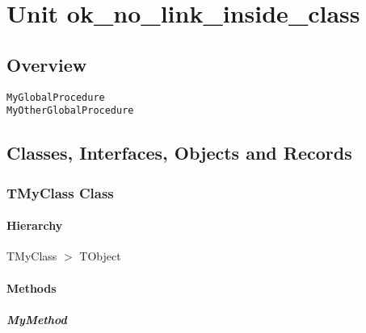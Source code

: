 \documentclass{report}
\newif\ifpdf
\begin{document}
\label{toc}\tableofcontents
\newpage
\newlength{\tmplength}
\chapter{Unit ok{\_}no{\_}link{\_}inside{\_}class}
\label{ok_no_link_inside_class}
\section{Overview}
\begin{description}
\item[\texttt{\begin{ttfamily}TMyClass\end{ttfamily} Class}]
\end{description}
\begin{description}
\item[\texttt{MyGlobalProcedure}]
\item[\texttt{MyOtherGlobalProcedure}]
\end{description}
\section{Classes, Interfaces, Objects and Records}
\ifpdf
\subsection*{\large{\textbf{TMyClass Class}}\normalsize\hspace{1ex}\hrulefill}
\else
\subsection*{TMyClass Class}
\fi
\label{ok_no_link_inside_class.TMyClass}
\subsubsection*{\large{\textbf{Hierarchy}}\normalsize\hspace{1ex}\hfill}
TMyClass {$>$} TObject
\subsubsection*{\large{\textbf{Methods}}\normalsize\hspace{1ex}\hfill}
\paragraph*{MyMethod}\hspace*{\fill}
\end{document}

